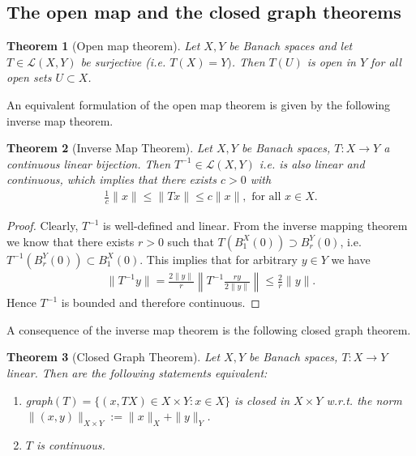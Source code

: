 \documentclass[11pt,a4paper]{article}
\newtheorem{thm}{Theorem}[section]
\theoremstyle{definition}
\begin{document}
\subsection{The open map and the closed graph theorems}
\begin{thm}[Open map theorem] Let $X,Y$ be Banach spaces and let $T \in \mathcal{L}(X,Y)$ be surjective (i.e. $T(X)=Y)$. Then $T(U)$ is open in $Y$ for all open sets $U \subset X$. 
\end{thm}
\noindent An equivalent formulation of the open map theorem is given by the following inverse map theorem.
\begin{thm}[Inverse Map Theorem] Let $X,Y$ be Banach spaces, $T:X \to Y$ a continuous linear bijection. Then $T^{-1} \in \mathcal{L}(X,Y)$ i.e. is also linear and continuous, which implies that there exists $c>0$ with 
\begin{align*}
\frac{1}{c}\|x\| \leq \|Tx\| \leq c\|x\|, \text{ for all } x \in X. 
\end{align*}
\end{thm}
\begin{proof}
Clearly, $T^{-1}$ is well-defined and linear. From the inverse mapping theorem we know that there exists $r>0$ such that $T(B_1^X(0)) \supset B_r^Y(0)$, i.e. $T^{-1}(B_r^Y(0)) \subset B_1^X(0)$. This implies that for arbitrary $y \in Y$ we have 
\begin{align*}
\|T^{-1} y \| = \frac{2\|y\|}{r} \left\| T^{-1} \frac{ry}{2\|y\|} \right\| \leq \frac{2}{r} \|y\|. 
\end{align*}
Hence $T^{-1}$ is bounded and therefore continuous. 
\end{proof}
\noindent A consequence of the inverse map theorem is the following closed graph theorem. 
\begin{thm}[Closed Graph Theorem] Let $X,Y$ be Banach spaces, $T: X \to Y$ linear. Then are the following statements equivalent: 
\begin{enumerate}
\item graph$(T)=\lbrace (x,TX) \in X \times Y : x \in X \rbrace$ is closed in $X \times Y$ w.r.t. the norm $\|(x,y)\|_{X \times Y} := \|x\|_X + \|y\|_Y$.
\item $T$ is continuous.
\end{enumerate}
\end{thm}
\end{document}
